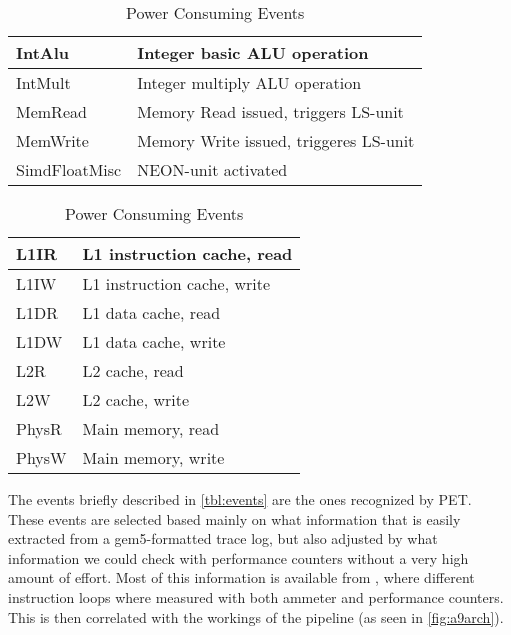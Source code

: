 \begin{table}[ht]
    \centering
    \begin{minipage}[b]{\linewidth}
        \centering
        \begin{tabular}{|l|l|}
            \hline
            IntAlu    & Integer basic ALU operation\\
            \hline
            IntMult    & Integer multiply ALU operation \\
            \hline
            MemRead    & Memory Read issued, triggers LS-unit \\
            \hline
            MemWrite    & Memory Write issued, triggeres LS-unit \\
            \hline
            SimdFloatMisc     & NEON-unit activated \\
            \hline
        \end{tabular}
    \end{minipage}

    \begin{minipage}[b]{\linewidth}
        \centering
        \begin{tabular}{|l|l|}
            \hline
            L1IR    & L1 instruction cache, read \\
            \hline
            L1IW    & L1 instruction cache, write \\
            \hline
            L1DR    & L1 data cache, read \\
            \hline
            L1DW    & L1 data cache, write \\
            \hline
            L2R     & L2 cache, read \\
            \hline
            L2W     & L2 cache, write \\
            \hline
            PhysR   & Main memory, read \\
            \hline
            PhysW   & Main memory, write \\
            \hline
        \end{tabular}
    \end{minipage}
    \caption{Power Consuming Events}
    \label{tbl:events}
\end{table}

The events briefly described in \autoref{tbl:events} are the ones recognized by
PET. These events are selected based mainly on what information that is easily
extracted from a gem5-formatted trace log, but also adjusted by what information
we could check with performance counters without a very high amount of effort.
Most of this information is available from \cite{rundehvatum2013exploring},
where different instruction loops where measured with both ammeter and
performance counters. This is then correlated with the workings of
the pipeline (as seen in \autoref{fig:a9arch}).

